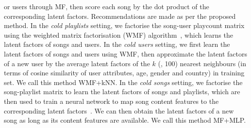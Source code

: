 \begin{itemize}
      or users through MF, then score each song by the dot product of the corresponding latent factors.
      Recommendations are made as per the proposed method.
      In the \emph{cold playlists} setting, we factorise the song-user playcount matrix using the 
      weighted matrix factorisation (WMF) algorithm~\cite{hu2008collaborative}, which learns the 
      latent factors of songs and users.
      In the \emph{cold users} setting, we first learn the latent factors of songs and users using WMF,
      then approximate the latent factors of a new user by the average latent factors of the $k$ (\eg, 100)
      nearest neighbours %
      (in terms of cosine similarity of user attributes, \eg age, gender and country) in training set.
      We call this method WMF+kNN.
      In the \emph{cold songs} setting, we factorise the song-playlist matrix to learn the latent factors of 
      songs and playlists, which are then used to train a neural network to map song content features 
      to the corresponding latent factors~\cite{Gantner:2010,van2013deep}.
	  We can then obtain the latent factors of a new song as long as its content features are available.
      We call this method MF+MLP. 
%
\end{itemize}



